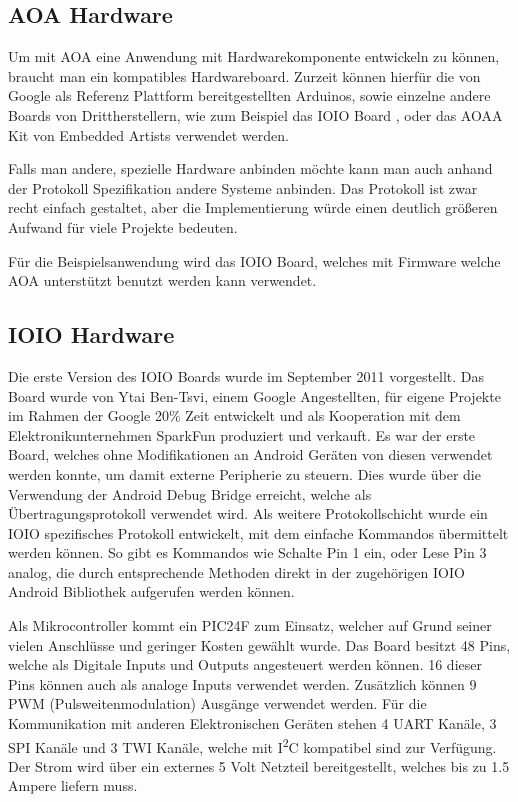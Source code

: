 \documentclass[12pt,journal,compsoc]{IEEEtran}
\begin{document}
\subsection{AOA Hardware}
Um mit AOA eine Anwendung mit Hardwarekomponente entwickeln zu können, braucht man ein kompatibles Hardwareboard.
Zurzeit können hierfür die von Google als Referenz Plattform bereitgestellten Arduinos, sowie einzelne andere Boards von Drittherstellern, wie zum Beispiel das IOIO Board \cite{ioio}, oder das AOAA Kit von Embedded Artists\cite{aoaa} verwendet werden.

Falls man andere, spezielle Hardware anbinden möchte kann man auch anhand der Protokoll Spezifikation \cite{aoaprotocol2} andere Systeme anbinden. 
Das Protokoll ist zwar recht einfach gestaltet, aber die Implementierung würde einen deutlich größeren Aufwand für viele Projekte bedeuten. 

Für die Beispielsanwendung wird das IOIO Board, welches mit Firmware welche AOA unterstützt benutzt werden kann verwendet.

\subsection{IOIO Hardware}
Die erste Version des IOIO Boards wurde im September 2011 vorgestellt. Das Board wurde von Ytai Ben-Tsvi, einem Google Angestellten, für eigene Projekte im Rahmen der Google 20\% Zeit entwickelt und als Kooperation mit dem Elektronikunternehmen SparkFun produziert und verkauft.
Es war der erste Board, welches ohne Modifikationen an Android Geräten von diesen verwendet werden konnte, um damit externe Peripherie zu steuern.
Dies wurde über die Verwendung der Android Debug Bridge erreicht, welche als Übertragungsprotokoll verwendet wird.
Als weitere Protokollschicht wurde ein IOIO spezifisches Protokoll entwickelt, mit dem einfache Kommandos übermittelt werden können.
So gibt es Kommandos wie \glqq Schalte Pin 1 ein\grqq, oder \glqq Lese Pin 3 analog\grqq, die durch entsprechende Methoden direkt in der zugehörigen IOIO Android Bibliothek aufgerufen werden können.

Als Mikrocontroller kommt ein PIC24F zum Einsatz, welcher auf Grund seiner vielen Anschlüsse und geringer Kosten gewählt wurde.
Das Board besitzt 48 Pins, welche als Digitale Inputs und Outputs angesteuert werden können. 16 dieser Pins können auch als analoge Inputs verwendet werden.
Zusätzlich können 9 PWM (Pulsweitenmodulation) Ausgänge verwendet werden.
Für die Kommunikation mit anderen Elektronischen Geräten stehen 4 UART Kanäle, 3 SPI Kanäle und 3 TWI Kanäle, welche mit I\textsuperscript{2}C kompatibel sind zur Verfügung.
Der Strom wird über ein externes 5 Volt Netzteil bereitgestellt, welches bis zu 1.5 Ampere liefern muss.
\end{document}
